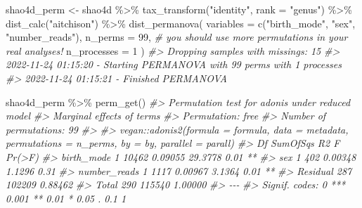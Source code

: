 \documentclass[
]{book}
\newenvironment{Shaded}{\begin{snugshade}}{\end{snugshade}}
\newcommand{\AttributeTok}[1]{\textcolor[rgb]{0.77,0.63,0.00}{#1}}
\newcommand{\CommentTok}[1]{\textcolor[rgb]{0.56,0.35,0.01}{\textit{#1}}}
\newcommand{\DecValTok}[1]{\textcolor[rgb]{0.00,0.00,0.81}{#1}}
\newcommand{\FunctionTok}[1]{\textcolor[rgb]{0.00,0.00,0.00}{#1}}
\newcommand{\NormalTok}[1]{#1}
\newcommand{\OtherTok}[1]{\textcolor[rgb]{0.56,0.35,0.01}{#1}}
\newcommand{\SpecialCharTok}[1]{\textcolor[rgb]{0.00,0.00,0.00}{#1}}
\newcommand{\StringTok}[1]{\textcolor[rgb]{0.31,0.60,0.02}{#1}}
\begin{document}
\begin{Shaded}
\begin{Highlighting}[]
\NormalTok{shao4d\_perm }\OtherTok{\textless{}{-}}\NormalTok{ shao4d }\SpecialCharTok{\%\textgreater{}\%}
  \FunctionTok{tax\_transform}\NormalTok{(}\StringTok{"identity"}\NormalTok{, }\AttributeTok{rank =} \StringTok{"genus"}\NormalTok{) }\SpecialCharTok{\%\textgreater{}\%}
  \FunctionTok{dist\_calc}\NormalTok{(}\StringTok{"aitchison"}\NormalTok{) }\SpecialCharTok{\%\textgreater{}\%}
  \FunctionTok{dist\_permanova}\NormalTok{(}
    \AttributeTok{variables =} \FunctionTok{c}\NormalTok{(}\StringTok{"birth\_mode"}\NormalTok{, }\StringTok{"sex"}\NormalTok{, }\StringTok{"number\_reads"}\NormalTok{),}
    \AttributeTok{n\_perms =} \DecValTok{99}\NormalTok{, }\CommentTok{\# you should use more permutations in your real analyses!}
    \AttributeTok{n\_processes =} \DecValTok{1}
\NormalTok{  )}
\CommentTok{\#\textgreater{} Dropping samples with missings: 15}
\CommentTok{\#\textgreater{} 2022{-}11{-}24 01:15:20 {-} Starting PERMANOVA with 99 perms with 1 processes}
\CommentTok{\#\textgreater{} 2022{-}11{-}24 01:15:21 {-} Finished PERMANOVA}

\NormalTok{shao4d\_perm }\SpecialCharTok{\%\textgreater{}\%} \FunctionTok{perm\_get}\NormalTok{()}
\CommentTok{\#\textgreater{} Permutation test for adonis under reduced model}
\CommentTok{\#\textgreater{} Marginal effects of terms}
\CommentTok{\#\textgreater{} Permutation: free}
\CommentTok{\#\textgreater{} Number of permutations: 99}
\CommentTok{\#\textgreater{}}
\CommentTok{\#\textgreater{} vegan::adonis2(formula = formula, data = metadata, permutations = n\_perms, by = by, parallel = parall)}
\CommentTok{\#\textgreater{}               Df SumOfSqs      R2       F Pr(\textgreater{}F)   }
\CommentTok{\#\textgreater{} birth\_mode     1    10462 0.09055 29.3778   0.01 **}
\CommentTok{\#\textgreater{} sex            1      402 0.00348  1.1296   0.31   }
\CommentTok{\#\textgreater{} number\_reads   1     1117 0.00967  3.1364   0.01 **}
\CommentTok{\#\textgreater{} Residual     287   102209 0.88462                  }
\CommentTok{\#\textgreater{} Total        290   115540 1.00000                  }
\CommentTok{\#\textgreater{} {-}{-}{-}}
\CommentTok{\#\textgreater{} Signif. codes:  0 \textquotesingle{}***\textquotesingle{} 0.001 \textquotesingle{}**\textquotesingle{} 0.01 \textquotesingle{}*\textquotesingle{} 0.05 \textquotesingle{}.\textquotesingle{} 0.1 \textquotesingle{} \textquotesingle{} 1}
\end{Highlighting}
\end{Shaded}
\end{document}
